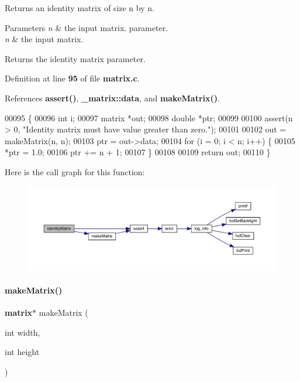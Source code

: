 Returns an identity matrix of size n by n. 


\begin{DoxyParams}{Parameters}
{\em n} & the input matrix. parameter.\\
\hline
{\em n} & the input matrix. \\
\hline
\end{DoxyParams}
\begin{DoxyReturn}{Returns}
the identity matrix parameter. 
\end{DoxyReturn}


Definition at line \textbf{ 95} of file \textbf{ matrix.\+c}.



References \textbf{ assert()}, \textbf{ \+\_\+matrix\+::data}, and \textbf{ make\+Matrix()}.


\begin{DoxyCode}
00095                               \{
00096   \textcolor{keywordtype}{int} i;
00097   matrix *out;
00098   \textcolor{keywordtype}{double} *ptr;
00099 
00100   assert(n > 0, \textcolor{stringliteral}{"Identity matrix must have value greater than zero."});
00101 
00102   out = makeMatrix(n, n);
00103   ptr = out->data;
00104   \textcolor{keywordflow}{for} (i = 0; i < n; i++) \{
00105     *ptr = 1.0;
00106     ptr += n + 1;
00107   \}
00108 
00109   \textcolor{keywordflow}{return} out;
00110 \}
\end{DoxyCode}
Here is the call graph for this function\+:
\nopagebreak
\begin{figure}[H]
\begin{center}
\leavevmode
\includegraphics[width=350pt]{matrix_8h_aa3f5e409b1641373be7cf7284e216d1a_cgraph}
\end{center}
\end{figure}
\mbox{\label{matrix_8h_aae8b56c6fb44d9147b835f4006ca872c}} 
\paragraph{make\+Matrix()}
{\footnotesize\ttfamily \textbf{ matrix}$\ast$ make\+Matrix (\begin{DoxyParamCaption}\item[{int}]{width,  }\item[{int}]{height }\end{DoxyParamCaption})}



